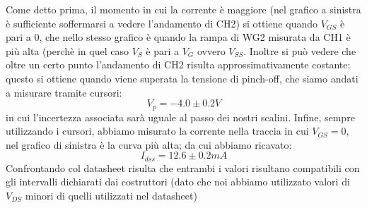 \documentclass[10pt, a4paper, italian]{article}
\begin{document}
Come detto prima, il momento in cui la corrente è maggiore (nel grafico a sinistra è sufficiente soffermarsi a vedere l'andamento di CH2) si ottiene quando $V_{GS}$ è pari a 0, che nello stesso grafico è quando la rampa di WG2 misurata da CH1 è più alta (perchè in quel caso $V_S$ è pari a $V_G$ ovvero $V_{SS}$.
Inoltre si può vedere che oltre un certo punto l'andamento di CH2 risulta approssimativamente costante: questo si ottiene quando viene superata la tensione di pinch-off, che siamo andati a misurare tramite cursori:
\[
V_p=-4.0 \pm 0.2 V
\]
in cui l'incertezza associata sarà uguale al passo dei nostri scalini.
Infine, sempre utilizzando i cursori, abbiamo misurato la corrente nella traccia in cui $V_{GS}=0$, nel grafico di sinistra è la curva più alta; da cui abbiamo ricavato:
\[
I_{dss}=12.6 \pm 0.2 mA
\]
Confrontando col datasheet risulta che entrambi i valori risultano compatibili con gli intervalli dichiarati dai costruttori (dato che noi abbiamo utilizzato valori di $V_{DS}$ minori di quelli utilizzati nel datasheet)
\end{document}
